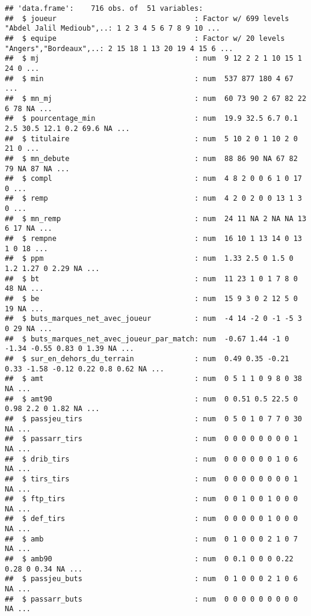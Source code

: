 \documentclass[7pt,]{report}
\begin{document}
\begin{verbatim}
## 'data.frame':    716 obs. of  51 variables:
##  $ joueur                                : Factor w/ 699 levels "Abdel Jalil Medioub",..: 1 2 3 4 5 6 7 8 9 10 ...
##  $ equipe                                : Factor w/ 20 levels "Angers","Bordeaux",..: 2 15 18 1 13 20 19 4 15 6 ...
##  $ mj                                    : num  9 12 2 2 1 10 15 1 24 0 ...
##  $ min                                   : num  537 877 180 4 67 ...
##  $ mn_mj                                 : num  60 73 90 2 67 82 22 6 78 NA ...
##  $ pourcentage_min                       : num  19.9 32.5 6.7 0.1 2.5 30.5 12.1 0.2 69.6 NA ...
##  $ titulaire                             : num  5 10 2 0 1 10 2 0 21 0 ...
##  $ mn_debute                             : num  88 86 90 NA 67 82 79 NA 87 NA ...
##  $ compl                                 : num  4 8 2 0 0 6 1 0 17 0 ...
##  $ remp                                  : num  4 2 0 2 0 0 13 1 3 0 ...
##  $ mn_remp                               : num  24 11 NA 2 NA NA 13 6 17 NA ...
##  $ rempne                                : num  16 10 1 13 14 0 13 1 0 18 ...
##  $ ppm                                   : num  1.33 2.5 0 1.5 0 1.2 1.27 0 2.29 NA ...
##  $ bt                                    : num  11 23 1 0 1 7 8 0 48 NA ...
##  $ be                                    : num  15 9 3 0 2 12 5 0 19 NA ...
##  $ buts_marques_net_avec_joueur          : num  -4 14 -2 0 -1 -5 3 0 29 NA ...
##  $ buts_marques_net_avec_joueur_par_match: num  -0.67 1.44 -1 0 -1.34 -0.55 0.83 0 1.39 NA ...
##  $ sur_en_dehors_du_terrain              : num  0.49 0.35 -0.21 0.33 -1.58 -0.12 0.22 0.8 0.62 NA ...
##  $ amt                                   : num  0 5 1 1 0 9 8 0 38 NA ...
##  $ amt90                                 : num  0 0.51 0.5 22.5 0 0.98 2.2 0 1.82 NA ...
##  $ passjeu_tirs                          : num  0 5 0 1 0 7 7 0 30 NA ...
##  $ passarr_tirs                          : num  0 0 0 0 0 0 0 0 1 NA ...
##  $ drib_tirs                             : num  0 0 0 0 0 0 1 0 6 NA ...
##  $ tirs_tirs                             : num  0 0 0 0 0 0 0 0 1 NA ...
##  $ ftp_tirs                              : num  0 0 1 0 0 1 0 0 0 NA ...
##  $ def_tirs                              : num  0 0 0 0 0 1 0 0 0 NA ...
##  $ amb                                   : num  0 1 0 0 0 2 1 0 7 NA ...
##  $ amb90                                 : num  0 0.1 0 0 0 0.22 0.28 0 0.34 NA ...
##  $ passjeu_buts                          : num  0 1 0 0 0 2 1 0 6 NA ...
##  $ passarr_buts                          : num  0 0 0 0 0 0 0 0 0 NA ...

\end{verbatim}
\end{document}
